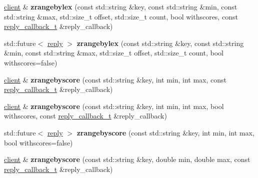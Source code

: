 \begin{DoxyCompactItemize}
\item 
\mbox{\label{classcpp__redis_1_1client_addea645452c87b56111aad26ce4d3bb5}} 
\mbox{\hyperlink{classcpp__redis_1_1client}{client}} \& {\bfseries zrangebylex} (const std\+::string \&key, const std\+::string \&min, const std\+::string \&max, std\+::size\+\_\+t offset, std\+::size\+\_\+t count, bool withscores, const \mbox{\hyperlink{classcpp__redis_1_1client_af7a65eb21aa25230bfbb0b0203c4fc04}{reply\+\_\+callback\+\_\+t}} \&reply\+\_\+callback)
\item 
\mbox{\label{classcpp__redis_1_1client_ab2a66d6831fb228cb5de0af97080f801}} 
std\+::future$<$ \mbox{\hyperlink{classcpp__redis_1_1reply}{reply}} $>$ {\bfseries zrangebylex} (const std\+::string \&key, const std\+::string \&min, const std\+::string \&max, std\+::size\+\_\+t offset, std\+::size\+\_\+t count, bool withscores=false)
\item 
\mbox{\label{classcpp__redis_1_1client_a520a7c2d2499b67ec1eb791ca3f8cc82}} 
\mbox{\hyperlink{classcpp__redis_1_1client}{client}} \& {\bfseries zrangebyscore} (const std\+::string \&key, int min, int max, const \mbox{\hyperlink{classcpp__redis_1_1client_af7a65eb21aa25230bfbb0b0203c4fc04}{reply\+\_\+callback\+\_\+t}} \&reply\+\_\+callback)
\item 
\mbox{\label{classcpp__redis_1_1client_a91a1f7e33760150dc4ed4548cc17fe38}} 
\mbox{\hyperlink{classcpp__redis_1_1client}{client}} \& {\bfseries zrangebyscore} (const std\+::string \&key, int min, int max, bool withscores, const \mbox{\hyperlink{classcpp__redis_1_1client_af7a65eb21aa25230bfbb0b0203c4fc04}{reply\+\_\+callback\+\_\+t}} \&reply\+\_\+callback)
\item 
\mbox{\label{classcpp__redis_1_1client_a026373604e64913039351ca838e0d71c}} 
std\+::future$<$ \mbox{\hyperlink{classcpp__redis_1_1reply}{reply}} $>$ {\bfseries zrangebyscore} (const std\+::string \&key, int min, int max, bool withscores=false)
\item 
\mbox{\label{classcpp__redis_1_1client_a7f0b361b7d775c353510dbbd2a213bc6}} 
\mbox{\hyperlink{classcpp__redis_1_1client}{client}} \& {\bfseries zrangebyscore} (const std\+::string \&key, double min, double max, const \mbox{\hyperlink{classcpp__redis_1_1client_af7a65eb21aa25230bfbb0b0203c4fc04}{reply\+\_\+callback\+\_\+t}} \&reply\+\_\+callback)

\end{DoxyCompactItemize}
